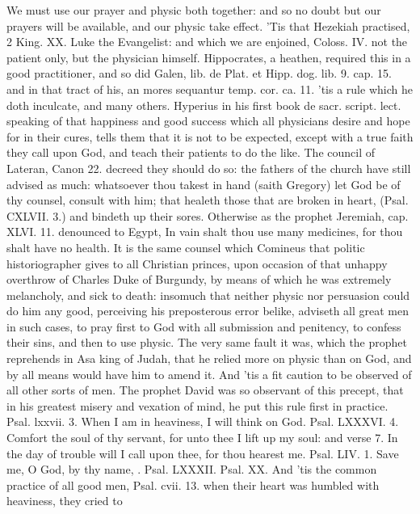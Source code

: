 {We must use our prayer and physic both together: and so no doubt but
our prayers will be available, and our physic take effect. 'Tis that
Hezekiah practised, 2 King. XX. Luke the Evangelist: and which we are
enjoined, Coloss. IV. not the patient only, but the physician himself.
Hippocrates, a heathen, required this in a good practitioner, and so
did Galen, lib. de Plat. et Hipp. dog. lib. 9. cap. 15. and in that
tract of his, an mores sequantur temp. cor. ca. 11. 'tis a rule which
he doth inculcate,  and many others. Hyperius in his first book
de sacr. script. lect. speaking of that happiness and good success
which all physicians desire and hope for in their cures, tells
them that it is not to be expected, except with a true faith they call
upon God, and teach their patients to do the like. The council of
Lateran, Canon 22. decreed they should do so: the fathers of the church
have still advised as much: whatsoever thou takest in hand (saith
Gregory) let God be of thy counsel, consult with him; that
healeth those that are broken in heart, (Psal. CXLVII. 3.) and bindeth
up their sores. Otherwise as the prophet Jeremiah, cap. XLVI. 11.
denounced to Egypt, In vain shalt thou use many medicines, for thou
shalt have no health. It is the same counsel which Comineus that
politic historiographer gives to all Christian princes, upon occasion
of that unhappy overthrow of Charles Duke of Burgundy, by means of
which he was extremely melancholy, and sick to death: insomuch that
neither physic nor persuasion could do him any good, perceiving his
preposterous error belike, adviseth all great men in such cases,
to pray first to God with all submission and penitency, to
confess their sins, and then to use physic. The very same fault it was,
which the prophet reprehends in Asa king of Judah, that he relied more
on physic than on God, and by all means would have him to amend it. And
'tis a fit caution to be observed of all other sorts of men. The
prophet David was so observant of this precept, that in his greatest
misery and vexation of mind, he put this rule first in practice. Psal.
lxxvii. 3. When I am in heaviness, I will think on God. Psal. LXXXVI.
4. Comfort the soul of thy servant, for unto thee I lift up my soul:
and verse 7. In the day of trouble will I call upon thee, for thou
hearest me. Psal. LIV. 1. Save me, O God, by thy name, \etc. Psal.
LXXXII. Psal. XX. And 'tis the common practice of all good men, Psal.
cvii. 13. when their heart was humbled with heaviness, they cried to
}
